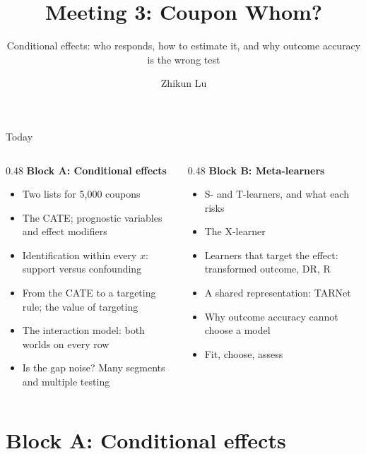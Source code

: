 \documentclass[aspectratio=169, 11pt, handout]{beamer}
\title[Meeting 3]{Meeting 3: Coupon Whom?}
\subtitle{Conditional effects: who responds, how to estimate it, and why outcome accuracy is the wrong test}
\author{Zhikun Lu}
\date{}
\begin{document}
\begin{frame}
\titlepage
\end{frame}

\begin{frame}{Today}

\begin{columns}[T]
\begin{column}{0.48\textwidth}
\textbf{Block A: Conditional effects}
\begin{itemize}
  \item Two lists for 5{,}000 coupons
  \item The CATE; prognostic variables and effect modifiers
  \item Identification within every $x$: support versus confounding
  \item From the CATE to a targeting rule; the value of targeting
  \item The interaction model: both worlds on every row
  \item Is the gap noise? Many segments and multiple testing
\end{itemize}
\end{column}
\begin{column}{0.48\textwidth}
\textbf{Block B: Meta-learners}
\begin{itemize}
  \item S- and T-learners, and what each risks
  \item The X-learner
  \item Learners that target the effect: transformed outcome, DR, R
  \item A shared representation: TARNet
  \item Why outcome accuracy cannot choose a model
  \item Fit, choose, assess
\end{itemize}
\end{column}
\end{columns}
\end{frame}

\section{Block A: Conditional effects}
\end{document}
